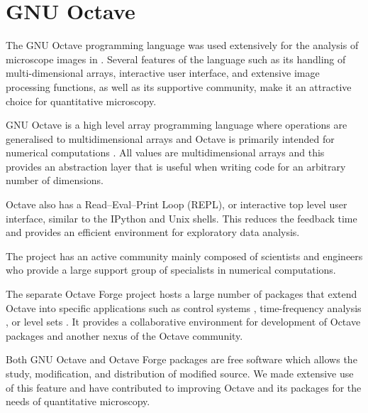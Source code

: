 \section{GNU Octave}

The GNU Octave programming language was used extensively for the analysis
of microscope images in .  Several features of the
language such as its handling of multi-dimensional arrays, interactive
user interface, and extensive image processing functions, as well as
its supportive community, make it an attractive choice
for quantitative microscopy.

GNU Octave is a high level array programming
language where operations are generalised to multidimensional arrays
and Octave is primarily intended for numerical computations \citep{octave}.
All values are multidimensional arrays and this provides
an abstraction layer that is useful when writing code for an arbitrary
number of dimensions.

Octave also has a Read--Eval--Print Loop (REPL), or interactive top
level user interface, similar to the IPython and Unix shells.  This reduces the
feedback time and provides an efficient
environment for exploratory data analysis.

The project has an active community
mainly composed of
scientists and engineers who provide a large support group of
specialists in numerical computations.

The separate Octave Forge project hosts a large number of
packages that extend Octave into specific applications such as control
systems \citep{octave-control}, time-frequency analysis
\citep{octave-ltfat}, or level sets \citep{octave-level-set}.
It provides a collaborative environment for development of Octave
packages and another nexus of the Octave community.

Both GNU Octave and Octave Forge packages are free software which allows
the study, modification, and distribution of modified source.
We made extensive
use of this feature and have contributed to improving Octave and its
packages for the needs of quantitative microscopy.

